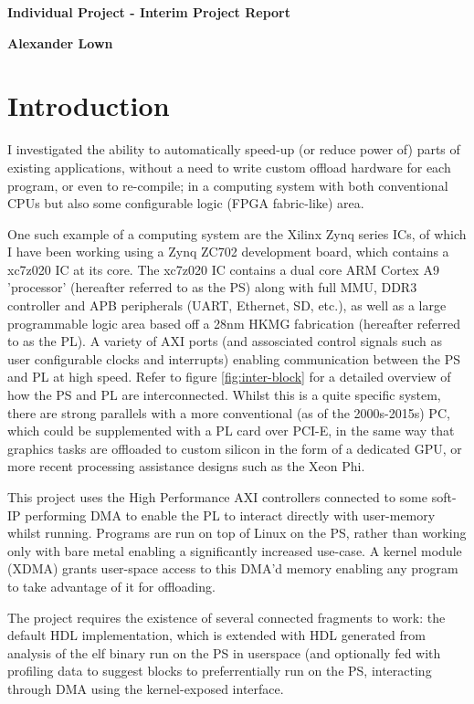 \documentclass[a4paper]{article}
\begin{document}
\centerline{\Large \bf Individual Project - Interim Project Report}
\medskip
\centerline{\bf Alexander Lown}
\bigskip

\section{Introduction}
I investigated the ability to automatically speed-up (or reduce power of) parts of existing applications, without a need to write custom offload hardware for each program, or even to re-compile; in a computing system with both conventional CPUs but also some configurable logic (FPGA fabric-like) area.

One such example of a computing system are the Xilinx Zynq series ICs, of which I have been working using a Zynq ZC702 development board, which contains a xc7z020 IC at its core. The xc7z020 IC contains a dual core ARM Cortex A9 'processor' (hereafter referred to as the PS) along with full MMU, DDR3 controller and APB peripherals (UART, Ethernet, SD, etc.), as well as a large programmable logic area based off a 28nm HKMG fabrication (hereafter referred to as the PL). A variety of AXI ports (and assosciated control signals such as user configurable clocks and interrupts) enabling communication between the PS and PL at high speed. Refer to figure \ref{fig:inter-block} for a detailed overview of how the PS and PL are interconnected. Whilst this is a quite specific system, there are strong parallels with a more conventional (as of the 2000s-2015s) PC, which could be supplemented with a PL card over PCI-E, in the same way that graphics tasks are offloaded to custom silicon in the form of a dedicated GPU, or more recent processing assistance designs such as the Xeon Phi.

This project uses the High Performance AXI controllers connected to some soft-IP performing DMA to enable the PL to interact directly with user-memory whilst running. Programs are run on top of Linux on the PS, rather than working only with bare metal enabling a significantly increased use-case. A kernel module (XDMA) grants user-space access to this DMA'd memory enabling any program to take advantage of it for offloading.

The project requires the existence of several connected fragments to work: the default HDL implementation, which is extended with HDL generated from analysis of the elf binary run on the PS in userspace (and optionally fed with profiling data to suggest blocks to preferrentially run on the PS, interacting through DMA using the kernel-exposed interface.
\end{document}
